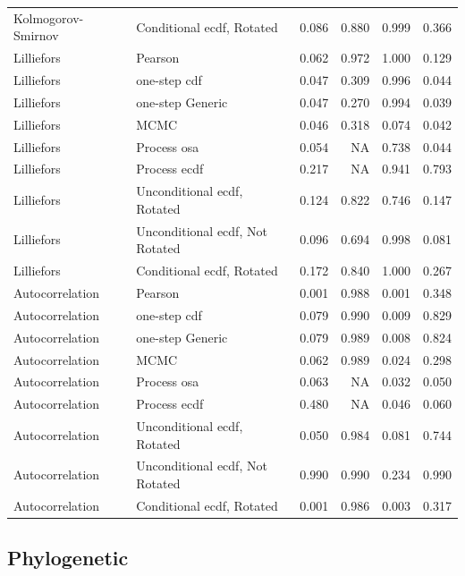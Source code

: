 \documentclass[
]{article}
\begin{document}
\begin{table}[H]
\begin{tabular}[t]{llrrrr}
Kolmogorov- Smirnov & Conditional ecdf, Rotated & 0.086 & 0.880 & 0.999 & 0.366\\
Lilliefors & Pearson & 0.062 & 0.972 & 1.000 & 0.129\\
Lilliefors & one-step cdf & 0.047 & 0.309 & 0.996 & 0.044\\
\addlinespace
Lilliefors & one-step Generic & 0.047 & 0.270 & 0.994 & 0.039\\
Lilliefors & MCMC & 0.046 & 0.318 & 0.074 & 0.042\\
Lilliefors & Process osa & 0.054 & NA & 0.738 & 0.044\\
Lilliefors & Process ecdf & 0.217 & NA & 0.941 & 0.793\\
Lilliefors & Unconditional ecdf, Rotated & 0.124 & 0.822 & 0.746 & 0.147\\
\addlinespace
Lilliefors & Unconditional ecdf, Not Rotated & 0.096 & 0.694 & 0.998 & 0.081\\
Lilliefors & Conditional ecdf, Rotated & 0.172 & 0.840 & 1.000 & 0.267\\
Autocorrelation & Pearson & 0.001 & 0.988 & 0.001 & 0.348\\
Autocorrelation & one-step cdf & 0.079 & 0.990 & 0.009 & 0.829\\
Autocorrelation & one-step Generic & 0.079 & 0.989 & 0.008 & 0.824\\
\addlinespace
Autocorrelation & MCMC & 0.062 & 0.989 & 0.024 & 0.298\\
Autocorrelation & Process osa & 0.063 & NA & 0.032 & 0.050\\
Autocorrelation & Process ecdf & 0.480 & NA & 0.046 & 0.060\\
Autocorrelation & Unconditional ecdf, Rotated & 0.050 & 0.984 & 0.081 & 0.744\\
Autocorrelation & Unconditional ecdf, Not Rotated & 0.990 & 0.990 & 0.234 & 0.990\\
\addlinespace
Autocorrelation & Conditional ecdf, Rotated & 0.001 & 0.986 & 0.003 & 0.317\\
\bottomrule
\end{tabular}
\end{table}

\subsection{Phylogenetic}\label{phylogenetic}
\end{document}
